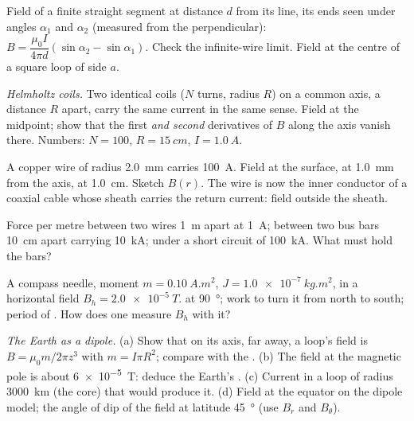 \begin{exercise}[$\star\star$]\label{exo:b1:magnetostatics:5}
Field of a finite straight segment at distance $d$ from its line, its
ends seen under angles $\alpha_1$ and $\alpha_2$ (measured from the
perpendicular): $B = \dfrac{\mu_0I}{4\pi d}(\sin\alpha_2 - \sin\alpha_1)$. Check
the infinite-wire limit. Field at the centre of a square loop of side
$a$.
\end{exercise}

\begin{exercise}[$\star\star$]\label{exo:b1:magnetostatics:6}
\emph{Helmholtz coils.} Two identical coils ($N$ turns, radius $R$) on a
common axis, a distance $R$ apart, carry the same current in the same
sense. Field at the midpoint; show that the first \emph{and second}
derivatives of $B$ along the axis vanish there. Numbers: $N = 100$,
$R = \qty{15}{cm}$, $I = \qty{1.0}{A}$.
\end{exercise}

\begin{exercise}[$\star\star$]\label{exo:b1:magnetostatics:7}
A copper wire of radius \qty{2.0}{mm} carries \qty{100}{A}. Field at the
surface, at \qty{1.0}{mm} from the axis, at \qty{1.0}{cm}. Sketch $B(r)$.
The wire is now the inner conductor of a coaxial cable whose sheath
carries the return current: field outside the sheath.
\end{exercise}

\begin{exercise}[$\star\star$]\label{exo:b1:magnetostatics:8}
Force per metre between two wires \qty{1}{m} apart at \qty{1}{A}; between
two bus bars \qty{10}{cm} apart carrying \qty{10}{kA}; under a short
circuit of \qty{100}{kA}. What must hold the bars?
\end{exercise}

\begin{exercise}[$\star\star$]\label{exo:b1:magnetostatics:9}
A compass needle, moment $m = \qty{0.10}{A.m^2}$, 
$J = \qty{1.0e-7}{kg.m^2}$, in a horizontal field $B_h = \qty{2.0e-5}{T}$.
 at \qty{90}{\degree}; work to turn it from north to south; period
of . How does one measure $B_h$ with it?
\end{exercise}

\begin{exercise}[$\star\star\star$]\label{exo:b1:magnetostatics:10}
\emph{The Earth as a dipole.} (a) Show that on its axis, far away, a
loop's field is $B = \mu_0m/2\pi z^3$ with $m = I\pi R^2$; compare with the
. (b) The field at the magnetic pole is about
\qty{6e-5}{T}: deduce the Earth's . (c) Current in a loop
of radius \qty{3000}{km} (the core) that would produce it. (d) Field at
the equator on the dipole model; the angle of dip of the field at
latitude \qty{45}{\degree} (use $B_r$ and $B_\theta$).
\end{exercise}

